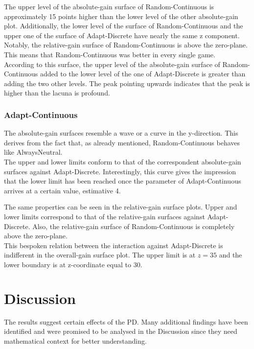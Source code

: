 \documentclass[11pt]{article}
\begin{document}
		The upper level of the absolute-gain surface of Random-Continuous is approximately 15 points higher than the lower level of the other absolute-gain plot.
		Additionally, the lower level of the surface of Random-Continuous and the upper one of the surface of Adapt-Discrete have nearly the same z component.
		Notably, the relative-gain surface of Random-Continuous is above the zero-plane.
		This means that Random-Continuous was better in every single game.\\

		According to this surface, the upper level of the absolute-gain surface of Random-Continuous added to the lower level of the one of Adapt-Discrete is greater than adding the two other levels.
		The peak pointing upwards indicates that the peak is higher than the lacuna is profound.\\
		

\subsubsection*{Adapt-Continuous}
		The absolute-gain surfaces resemble a wave or a curve in the y-direction.
		This derives from the fact that, as already mentioned, Random-Continuous behaves like AlwaysNeutral.\\
		The upper and lower limits conform to that of the correspondent absolute-gain surfaces against Adapt-Discrete.
		Interestingly, this curve gives the impression that the lower limit has been reached once the parameter of Adapt-Continuous arrives at a certain value, estimative 4.

		The same properties can be seen in the relative-gain surface plots.
		Upper and lower limits correspond to that of the relative-gain surfaces against Adapt-Discrete.
		Also, the relative-gain surface of Random-Continuous is completely above the zero-plane.\\

		This bespoken relation between the interaction against Adapt-Discrete is indifferent in the overall-gain surface plot.
		The upper limit is at $z = 35$ and the lower boundary is at z-coordinate equal to 30.


\section{Discussion}

The results suggest certain effects of the PD.
Many additional findings have been identified and were promised to be analysed in the Discussion since they need mathematical context for better understanding.
\end{document}
